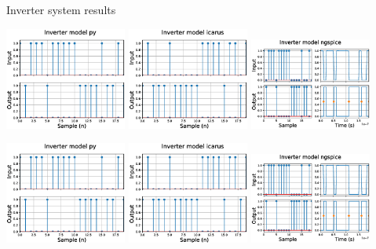 \documentclass{sdkslides}
\begin{document}
\subsection*{\sectionname}
\begin{frame}[t]
    \frametitle{\sectionname}
    \begin{block}{Inverter system results}
        \begin{center}
            \includegraphics[width=0.3\textwidth]{./Pics/inv_serialpy.eps}
            \includegraphics[width=0.3\textwidth]{./Pics/inv_serialicarus.eps}
            \includegraphics[width=0.3\textwidth]{./Pics/inv_serialngspice.eps}

            \includegraphics[width=0.3\textwidth]{./Pics/inv_serialpy.eps}
            \includegraphics[width=0.3\textwidth]{./Pics/inv_serialicarus.eps}
            \includegraphics[width=0.3\textwidth]{./Pics/inv_serialngspice.eps}
        \end{center}
    \end{block}
\end{frame}
\end{document}
